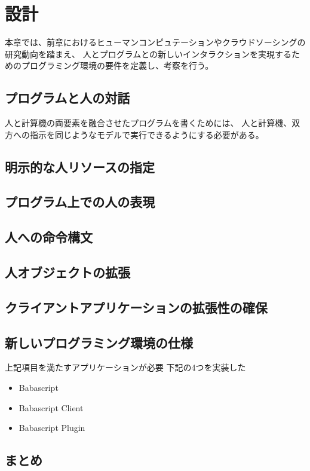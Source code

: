 \chapter{設計}
\label{chap:design}

本章では、前章におけるヒューマンコンピュテーションやクラウドソーシングの研究動向を踏まえ、
人とプログラムとの新しいインタラクションを実現するためのプログラミング環境の要件を定義し、考察を行う。

\section{プログラムと人の対話}\label{ux30d7ux30edux30b0ux30e9ux30e0ux3068ux4ebaux306eux5bfeux8a71}

人と計算機の両要素を融合させたプログラムを書くためには、
人と計算機、双方への指示を同じようなモデルで実行できるようにする必要がある。

\section{明示的な人リソースの指定}\label{ux660eux793aux7684ux306aux4ebaux30eaux30bdux30fcux30b9ux306eux6307ux5b9a}

\section{プログラム上での人の表現}\label{ux30d7ux30edux30b0ux30e9ux30e0ux4e0aux3067ux306eux4ebaux306eux8868ux73fe}

\section{人への命令構文}\label{ux4ebaux3078ux306eux547dux4ee4ux69cbux6587}

\section{人オブジェクトの拡張}\label{ux4ebaux30aaux30d6ux30b8ux30a7ux30afux30c8ux306eux62e1ux5f35}

\section{クライアントアプリケーションの拡張性の確保}\label{ux30afux30e9ux30a4ux30a2ux30f3ux30c8ux30a2ux30d7ux30eaux30b1ux30fcux30b7ux30e7ux30f3ux306eux62e1ux5f35ux6027ux306eux78baux4fdd}

\section{新しいプログラミング環境の仕様}\label{ux65b0ux3057ux3044ux30d7ux30edux30b0ux30e9ux30dfux30f3ux30b0ux74b0ux5883ux306eux4ed5ux69d8}

上記項目を満たすアプリケーションが必要 下記の4つを実装した

\begin{itemize}
\itemsep1pt\parskip0pt
\item
  Babascript
\item
  Babascript Client
\item
  Babascript Plugin
\end{itemize}

\section{まとめ}\label{ux307eux3068ux3081}
